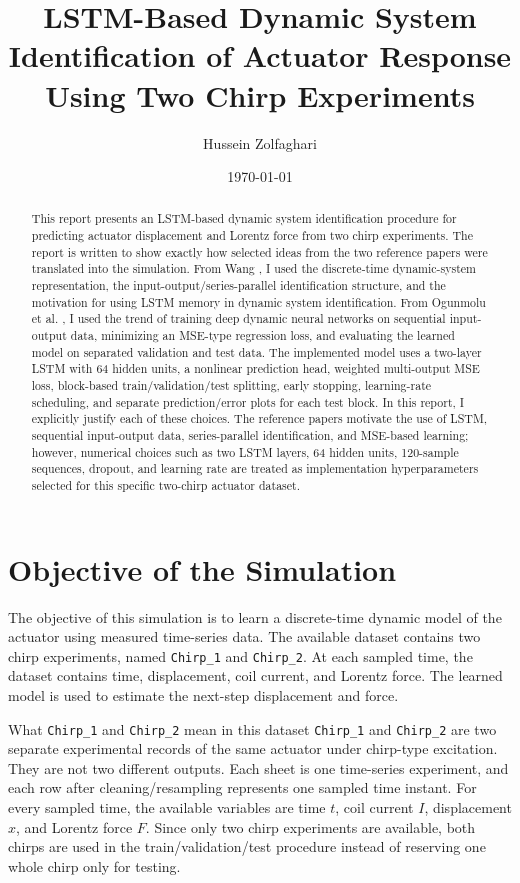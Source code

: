 \documentclass[11pt]{article}
\title{LSTM-Based Dynamic System Identification of Actuator Response Using Two Chirp Experiments}
\author{Hussein Zolfaghari}
\date{\today}
\begin{document}
\maketitle


\begin{abstract}
This report presents an LSTM-based dynamic system identification procedure for predicting actuator displacement and Lorentz force from two chirp experiments. The report is written to show exactly how selected ideas from the two reference papers were translated into the simulation. From Wang \cite{wang2017}, I used the discrete-time dynamic-system representation, the input-output/series-parallel identification structure, and the motivation for using LSTM memory in dynamic system identification. From Ogunmolu et al. \cite{ogunmolu2016}, I used the trend of training deep dynamic neural networks on sequential input-output data, minimizing an MSE-type regression loss, and evaluating the learned model on separated validation and test data. The implemented model uses a two-layer LSTM with 64 hidden units, a nonlinear prediction head, weighted multi-output MSE loss, block-based train/validation/test splitting, early stopping, learning-rate scheduling, and separate prediction/error plots for each test block. In this report, I explicitly justify each of these choices. The reference papers motivate the use of LSTM, sequential input-output data, series-parallel identification, and MSE-based learning; however, numerical choices such as two LSTM layers, 64 hidden units, 120-sample sequences, dropout, and learning rate are treated as implementation hyperparameters selected for this specific two-chirp actuator dataset.
\end{abstract}


\section{Objective of the Simulation}
The objective of this simulation is to learn a discrete-time dynamic model of the actuator using measured time-series data. The available dataset contains two chirp experiments, named \texttt{Chirp\_1} and \texttt{Chirp\_2}. At each sampled time, the dataset contains time, displacement, coil current, and Lorentz force. The learned model is used to estimate the next-step displacement and force.

\begin{datadecisionbox}{What \texttt{Chirp\_1} and \texttt{Chirp\_2} mean in this dataset}
\texttt{Chirp\_1} and \texttt{Chirp\_2} are two separate experimental records of the same actuator under chirp-type excitation. They are not two different outputs. Each sheet is one time-series experiment, and each row after cleaning/resampling represents one sampled time instant. For every sampled time, the available variables are time $t$, coil current $I$, displacement $x$, and Lorentz force $F$. Since only two chirp experiments are available, both chirps are used in the train/validation/test procedure instead of reserving one whole chirp only for testing.
\end{datadecisionbox}
\end{document}
